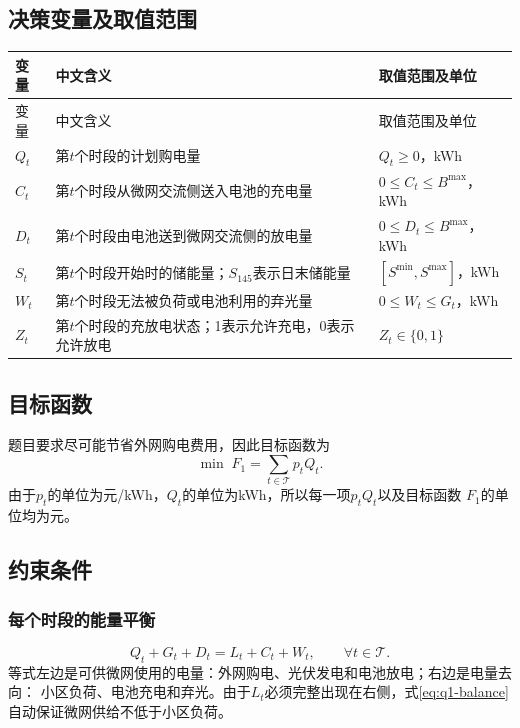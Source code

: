 \documentclass[UTF8,11pt]{ctexart}
\begin{document}
\subsection{决策变量及取值范围}

\begin{longtable}{>{\centering\arraybackslash}p{2.6cm}p{7.2cm}p{2.4cm}}
\toprule
变量 & 中文含义 & 取值范围及单位 \\
\midrule
\endfirsthead
\toprule
变量 & 中文含义 & 取值范围及单位 \\
\midrule
\endhead
$Q_t$ & 第$t$个时段的计划购电量 & $Q_t\geq 0$，kWh \\
$C_t$ & 第$t$个时段从微网交流侧送入电池的充电量 & $0\leq C_t\leq B^{\max}$，kWh \\
$D_t$ & 第$t$个时段由电池送到微网交流侧的放电量 & $0\leq D_t\leq B^{\max}$，kWh \\
$S_t$ & 第$t$个时段开始时的储能量；$S_{145}$表示日末储能量 & $[S^{\min},S^{\max}]$，kWh \\
$W_t$ & 第$t$个时段无法被负荷或电池利用的弃光量 & $0\leq W_t\leq G_t$，kWh \\
$Z_t$ & 第$t$个时段的充放电状态；1表示允许充电，0表示允许放电 & $Z_t\in\{0,1\}$ \\
\bottomrule
\end{longtable}

\subsection{目标函数}

题目要求尽可能节省外网购电费用，因此目标函数为
\begin{equation}
    \min\; F_1=\sum_{t\in\mathcal{T}}p_tQ_t.
    \label{eq:q1-objective}
\end{equation}
由于$p_t$的单位为元/kWh，$Q_t$的单位为kWh，所以每一项$p_tQ_t$以及目标函数
$F_1$的单位均为元。

\subsection{约束条件}

\subsubsection{每个时段的能量平衡}

\begin{equation}
    Q_t+G_t+D_t=L_t+C_t+W_t,
    \qquad \forall t\in\mathcal{T}.
    \label{eq:q1-balance}
\end{equation}
等式左边是可供微网使用的电量：外网购电、光伏发电和电池放电；右边是电量去向：
小区负荷、电池充电和弃光。由于$L_t$必须完整出现在右侧，式\eqref{eq:q1-balance}
自动保证微网供给不低于小区负荷。
\end{document}
